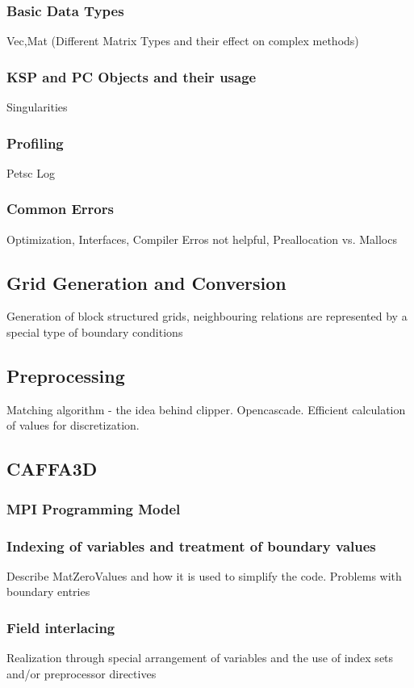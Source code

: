 \documentclass[article,type=msc,colorback,accentcolor=tud2a]{tudthesis}
\begin{document}
      \subsubsection{Basic Data Types}
        Vec,Mat (Different Matrix Types and their effect on complex methods)
      \subsubsection{KSP and PC Objects and their usage}
        Singularities
      \subsubsection{Profiling}
        Petsc Log 
      \subsubsection{Common Errors}
        Optimization, Interfaces, Compiler Erros not helpful, Preallocation vs. Mallocs

    \subsection{Grid Generation and Conversion}
    Generation of block structured grids, neighbouring relations are represented by a special type of boundary conditions
    \subsection{Preprocessing}
    Matching algorithm - the idea behind clipper. Opencascade. Efficient calculation of values for discretization.
    \subsection{CAFFA3D}

      \subsubsection{MPI Programming Model}
      \subsubsection{Indexing of variables and treatment of boundary values}
        Describe MatZeroValues and how it is used to simplify the code. Problems with boundary entries
      \subsubsection{Field interlacing}
        Realization through special arrangement of variables and the use of index sets and/or preprocessor directives
\end{document}
